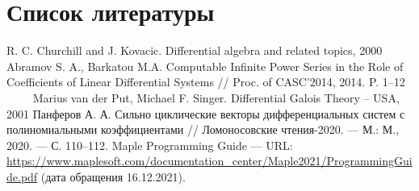 \section{Список литературы}

\begingroup
\renewcommand{\section}[2]{}

\begin{thebibliography}{5}
        R. C. Churchill and J. Kovacic. Differential algebra and related topics, 2000
        Abramov S. A., Barkatou M.A. Computable Infinite Power Series in the Role of Coefficients of Linear Differential Systems // Proc. of CASC’2014, 2014. P. 1--12
        Marius van der Put, Michael F. Singer. Differential Galois Theory – USA, 2001
        Панферов А. А. Сильно циклические векторы дифференциальных систем с полиномиальными коэффициентами // Ломоносовские чтения-2020. --- М.: М., 2020. --- С. 110--112.
        Maple Programming Guide --- URL: \url{https://www.maplesoft.com/documentation_center/Maple2021/ProgrammingGuide.pdf} (дата обращения 16.12.2021).
\end{thebibliography}

\endgroup